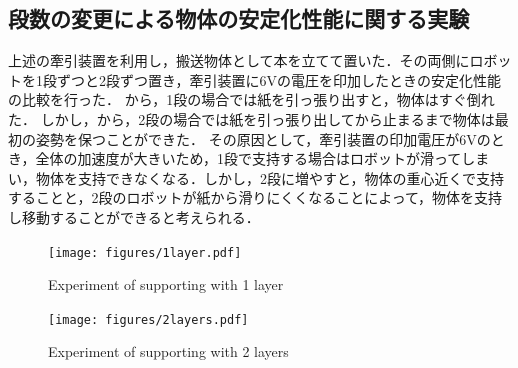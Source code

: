 \subsection{段数の変更による物体の安定化性能に関する実験}
上述の牽引装置を利用し，搬送物体として本を立てて置いた．その両側にロボットを1段ずつと2段ずつ置き，牽引装置に6Vの電圧を印加したときの安定化性能の比較を行った．
から，1段の場合では紙を引っ張り出すと，物体はすぐ倒れた．
しかし，から，2段の場合では紙を引っ張り出してから止まるまで物体は最初の姿勢を保つことができた．
その原因として，牽引装置の印加電圧が6Vのとき，全体の加速度が大きいため，1段で支持する場合はロボットが滑ってしまい，物体を支持できなくなる．しかし，2段に増やすと，物体の重心近くで支持することと，2段のロボットが紙から滑りにくくなることによって，物体を支持し移動することができると考えられる．
\begin{figure}[tb]
  \centering
  \texttt{[image: figures/1layer.pdf]}
  \caption{Experiment of supporting with 1 layer}
  \label{fig:1layer}
\end{figure}
\begin{figure}[tb]
  \centering
  \texttt{[image: figures/2layers.pdf]}
  \caption{Experiment of supporting with 2 layers}
  \label{fig:2layer}
\end{figure}

